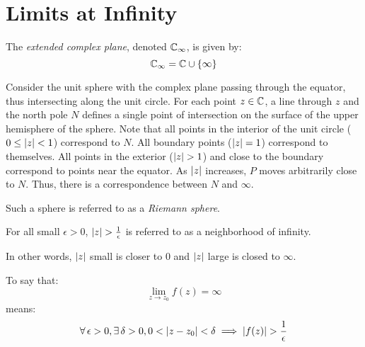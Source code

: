 \documentclass[letterpaper,12pt,fleqn]{article}
\newcommand{\ecp}{\C_{\infty}}
\renewcommand{\d}{\delta}
\newcommand{\e}{\epsilon}
\newcommand{\limz}{\lim_{z\to z_0}}
\begin{document}
\section*{Limits at Infinity}

\begin{definition}
  The \emph{extended complex plane}, denoted $\ecp$, is given by:
  \[\ecp=\C\cup\{\infty\}\]
\end{definition}

Consider the unit sphere with the complex plane passing through the equator,
thus intersecting along the unit circle. For each point $z\in\mathbb{C}$, a line through
$z$ and the north pole $N$ defines a single point of intersection on the
surface of the upper hemisphere of the sphere. Note that all points in the
interior of the unit circle ($0\le\lvert z\rvert<1$) correspond to $N$. All boundary
points ($\lvert z\rvert=1$) correspond to themselves. All points in the exterior
($\lvert z\rvert>1$) and close to the boundary correspond to points near the equator.
As $\lvert z\rvert$ increases, $P$ moves arbitrarily close to $N$. Thus, there is a
correspondence between $N$ and $\infty$.

\bigskip


\bigskip

Such a sphere is referred to as a \emph{Riemann sphere}.

\begin{definition}
  For all small $\e>0$, $\abs{z}>\frac{1}{\e}$ is referred to as a
  neighborhood of infinity.
\end{definition}

In other words, $\lvert z\rvert$ small is closer to $0$ and $\lvert z\rvert$ large is
closed to $\infty$.

\begin{definition}
  To say that:
  \[\limz{f(z)}=\infty\]
  means:
  \[\forall\,\e>0,\exists\,\d>0,0<\abs{z-z_0}<\d\implies
  \abs{f(z)}>\frac{1}{\e}\]
\end{definition}
\end{document}
